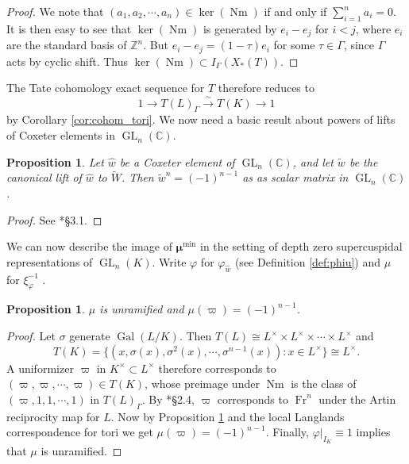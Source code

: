 \documentclass{compositio}
\theoremstyle{plain}
\newtheorem{proposition}[theorem]{Proposition}
\theoremstyle{definition}
\numberwithin{equation}{section}
\DeclareMathOperator{\Gal}{Gal}
\DeclareMathOperator{\Nm}{Nm}
\DeclareMathOperator{\Fr}{Fr}
\DeclareMathOperator{\GL}{GL}
\newcommand{\CC}{\mathbb{C}}
\newcommand{\Kx}{K^\times}
\newcommand{\Lx}{L^\times}
\newcommand{\bmu}{\boldsymbol\mu}
\newcommand{\mumin}{\bmu^{\min}}
\begin{document}
\begin{proof}
We note that $(a_1, a_2, \cdots, a_n) \in \ker(\Nm)$ if and only if $\sum_{i=1}^n a_i = 0$.
It is then easy to see that $\ker(\Nm)$ is generated by $e_i - e_j$ for $i < j$, where
$e_i$ are the standard basis of $\mathbb{Z}^n$.  But $e_i - e_j = (1 - \tau)e_i$ for some
$\tau \in \Gamma$, since $\Gamma$ acts by cyclic shift.  Thus $\ker(\Nm) \subset I_{\Gamma}(X_*(T))$.
\end{proof}

The Tate cohomology exact sequence for $T$ therefore reduces to
$$1 \rightarrow T(L)_{\Gamma} \xrightarrow{\sim} T(K) \rightarrow 1$$ by
Corollary \ref{cor:cohom_tori}.  We now need a basic result about powers of lifts
of Coxeter elements in $\GL_{n}(\CC)$.

\begin{proposition}\label{prop:powers_of_lifts}
Let $\hat{w}$ be a Coxeter element of $\GL_{n}(\CC)$, and let $\tilde{w}$ be the
canonical lift of $\hat{w}$ to $\widetilde{W}$. Then $\tilde{w}^n = (-1)^{n-1}$ as
as scalar matrix in $\GL_{n}(\CC)$.
\end{proposition}

\begin{proof}
See \cite{zaremsky:ppa}*{\S3.1}.
\end{proof}

We can now describe the image of $\mumin$ in the setting of
depth zero supercuspidal representations of $\GL_{n}(K)$.  Write
$\varphi$ for $\varphi_{\hat{w}}$ (see Definition \ref{def:phiu}) and $\mu$ for $\xi_{\varphi}^{-1}$ .

\begin{proposition} \label{prop:rectifier_agreement}
$\mu$ is unramified and
$\mu(\varpi) = (-1)^{n-1}$.
\end{proposition}

\begin{proof}
Let $\sigma$ generate $\Gal(L/K)$.  Then $T(L) \cong \Lx \times \Lx \times \cdots \times \Lx$ and
$$T(K) = \{(x, \sigma(x), \sigma^2(x), \cdots, \sigma^{n-1}(x)) : x \in \Lx \} \cong \Lx.$$
A uniformizer $\varpi$ in $\Kx \subset \Lx$
therefore corresponds to $(\varpi, \varpi, \cdots, \varpi) \in T(K)$, whose
preimage under $\Nm$ is the class of $(\varpi, 1, 1, \cdots, 1)$ in $T(L)_{\Gamma}$.
By \cite{serre:LocalClassFieldThy}*{\S 2.4}, $\varpi$ corresponds to $\Fr^n$ under the Artin
reciprocity map for $L$.  Now by Proposition \ref{prop:powers_of_lifts}
and the local Langlands correspondence for tori we get
$\mu(\varpi) = (-1)^{n-1}$.
Finally, $\varphi|_{I_K} \equiv 1$ implies that $\mu$ is
unramified.
\end{proof}
\end{document}
